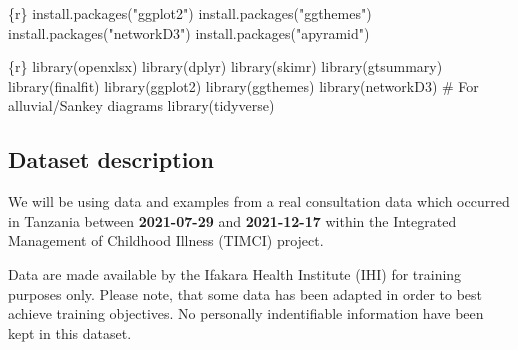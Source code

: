 \documentclass[
  letterpaper,
  DIV=11,
  numbers=noendperiod,
  oneside]{scrreprt}
\newenvironment{Shaded}{\begin{snugshade}}{\end{snugshade}}
\newcommand{\CommentTok}[1]{\textcolor[rgb]{0.37,0.37,0.37}{#1}}
\newcommand{\FunctionTok}[1]{\textcolor[rgb]{0.28,0.35,0.67}{#1}}
\newcommand{\InformationTok}[1]{\textcolor[rgb]{0.37,0.37,0.37}{#1}}
\newcommand{\NormalTok}[1]{\textcolor[rgb]{0.00,0.23,0.31}{#1}}
\newcommand{\StringTok}[1]{\textcolor[rgb]{0.13,0.47,0.30}{#1}}
\begin{document}
\begin{Shaded}
\begin{Highlighting}[]
\InformationTok{\textasciigrave{}\textasciigrave{}\textasciigrave{}\{r\}}
\FunctionTok{install.packages}\NormalTok{(}\StringTok{"ggplot2"}\NormalTok{)}
\FunctionTok{install.packages}\NormalTok{(}\StringTok{"ggthemes"}\NormalTok{)}
\FunctionTok{install.packages}\NormalTok{(}\StringTok{"networkD3"}\NormalTok{)}
\FunctionTok{install.packages}\NormalTok{(}\StringTok{"apyramid"}\NormalTok{)}
\InformationTok{\textasciigrave{}\textasciigrave{}\textasciigrave{}}
\end{Highlighting}
\end{Shaded}

\begin{Shaded}
\begin{Highlighting}[]
\InformationTok{\textasciigrave{}\textasciigrave{}\textasciigrave{}\{r\}}
\FunctionTok{library}\NormalTok{(openxlsx)}
\FunctionTok{library}\NormalTok{(dplyr)}
\FunctionTok{library}\NormalTok{(skimr)}
\FunctionTok{library}\NormalTok{(gtsummary)}
\FunctionTok{library}\NormalTok{(finalfit)}
\FunctionTok{library}\NormalTok{(ggplot2)}
\FunctionTok{library}\NormalTok{(ggthemes)}
\FunctionTok{library}\NormalTok{(networkD3) }\CommentTok{\# For alluvial/Sankey diagrams}
\FunctionTok{library}\NormalTok{(tidyverse)}
\InformationTok{\textasciigrave{}\textasciigrave{}\textasciigrave{}}
\end{Highlighting}
\end{Shaded}

\hypertarget{dataset-description}{%
\subsection{Dataset description}\label{dataset-description}}

We will be using data and examples from a real consultation data which
occurred in Tanzania between \textbf{2021-07-29} and \textbf{2021-12-17}
within the Integrated Management of Childhood Illness (TIMCI) project.

\begin{tcolorbox}[enhanced jigsaw, colbacktitle=quarto-callout-important-color!10!white, titlerule=0mm, breakable, opacityback=0, opacitybacktitle=0.6, left=2mm, coltitle=black, colback=white, title=\textcolor{quarto-callout-important-color}{\faExclamation}\hspace{0.5em}{Important}, rightrule=.15mm, colframe=quarto-callout-important-color-frame, toprule=.15mm, bottomtitle=1mm, toptitle=1mm, arc=.35mm, bottomrule=.15mm, leftrule=.75mm]
Data are made available by the Ifakara Health Institute (IHI) for
training purposes only. Please note, that some data has been adapted in
order to best achieve training objectives. No personally indentifiable
information have been kept in this dataset.
\end{tcolorbox}
\end{document}
